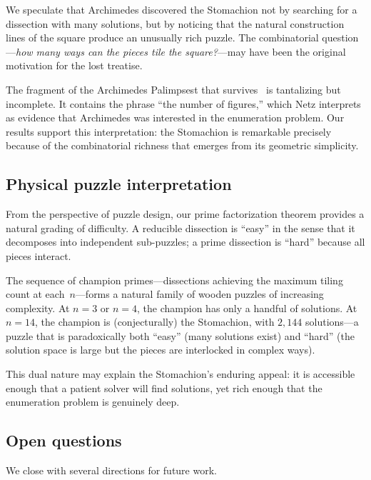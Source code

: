 \documentclass[12pt]{article}
\theoremstyle{definition}
\theoremstyle{remark}
\begin{document}
We speculate that Archimedes discovered the Stomachion not by searching
for a dissection with many solutions, but by noticing that the natural
construction lines of the square produce an unusually rich puzzle. The
combinatorial question---\emph{how many ways can the pieces tile the
square?}---may have been the original motivation for the lost treatise.

The fragment of the Archimedes Palimpsest that survives~\cite{Netz2004}
is tantalizing but incomplete. It contains the phrase ``the number of
figures,'' which Netz interprets as evidence that Archimedes was
interested in the enumeration problem. Our results support this
interpretation: the Stomachion is remarkable precisely because of the
combinatorial richness that emerges from its geometric simplicity.

\subsection{Physical puzzle interpretation}

From the perspective of puzzle design, our prime factorization theorem
provides a natural grading of difficulty. A reducible dissection is
``easy'' in the sense that it decomposes into independent sub-puzzles; a
prime dissection is ``hard'' because all pieces interact.

The sequence of champion primes---dissections achieving the maximum
tiling count at each~$n$---forms a natural family of wooden puzzles of
increasing complexity. At $n = 3$ or $n = 4$, the champion has only a
handful of solutions. At $n = 14$, the champion is (conjecturally) the
Stomachion, with $2{,}144$ solutions---a puzzle that is paradoxically
both ``easy'' (many solutions exist) and ``hard'' (the solution space is
large but the pieces are interlocked in complex ways).

This dual nature may explain the Stomachion's enduring appeal: it is
accessible enough that a patient solver will find solutions, yet rich
enough that the enumeration problem is genuinely deep.

\subsection{Open questions}

We close with several directions for future work.
\end{document}
